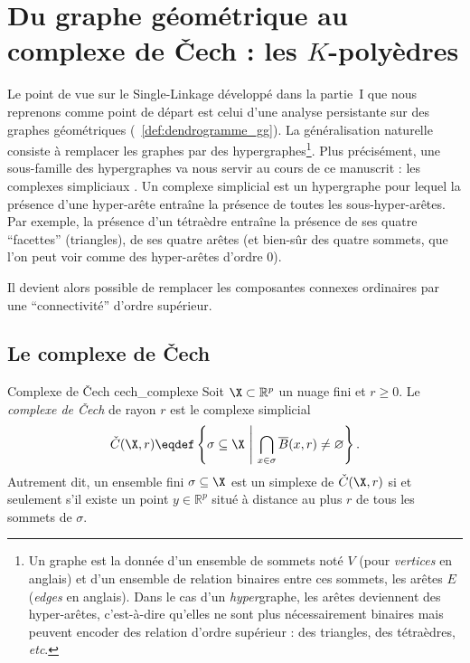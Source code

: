 \section{Du graphe géométrique au complexe de \v Cech : les $K$-polyèdres}

Le point de vue sur le Single-Linkage développé dans la partie~I que nous reprenons comme point de départ est celui d'une analyse persistante sur des graphes géométriques (\Def~\ref{def:dendrogramme_gg}). La généralisation naturelle consiste à remplacer les graphes par des hypergraphes\footnote{Un graphe est la donnée d'un ensemble de sommets noté $V$ (pour \emph{vertices} en anglais) et d'un ensemble de relation binaires entre ces sommets, les arêtes $E$ (\emph{edges} en anglais). Dans le cas d'un \emph{hyper}graphe, les arêtes deviennent des hyper-arêtes, c'est-à-dire qu'elles ne sont plus nécessairement binaires mais peuvent encoder des relation d'ordre supérieur : des triangles, des tétraèdres, \emph{etc}.}.
Plus précisément, une sous-famille des hypergraphes va nous servir au cours de ce manuscrit : les complexes simpliciaux \cite{Munkres}. Un complexe simplicial est un hypergraphe pour lequel la présence d'une hyper-arête entraîne la présence de toutes les sous-hyper-arêtes. Par exemple, la présence d'un tétraèdre entraîne la présence de ses quatre ``facettes'' (triangles), de ses quatre arêtes (et bien-sûr des quatre sommets, que l'on peut voir comme des hyper-arêtes d'ordre $0$).

Il devient alors possible de remplacer les composantes connexes ordinaires par une ``connectivité'' d'ordre supérieur.

\subsection{Le complexe de \v Cech}

\begin{Definition}{Complexe de \v Cech \cite{Cech1932, Munkres, BoissonnatChazalYvinec}}{cech_complexe}
Soit $\X\subset \mathbb R^p$ un nuage fini et $r\ge 0$. Le \emph{complexe de \v Cech} de rayon $r$ est le complexe simplicial
\[
    \check C(\X,r) \eqdef \left\{\sigma\subseteq \X \ \middle|\  \bigcap_{x\in \sigma}\overline B(x,r)\neq \varnothing \right\}.
\]
Autrement dit, un ensemble fini $\sigma\subseteq \X$ est un simplexe de $\check C(\X,r)$ si et seulement s'il existe un point $y\in\mathbb R^p$ situé à distance au plus $r$ de tous les sommets de $\sigma$.
\end{Definition}

